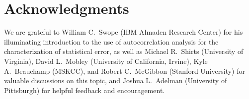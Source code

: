 \documentclass[aps,pre,twocolumn,nofootinbib,superscriptaddress,linenumbers,11point]{revtex4-1}
\begin{document}

\section*{Acknowledgments}

We are grateful to William C.~Swope (IBM Almaden Research Center) for his illuminating introduction to the use of autocorrelation analysis for the characterization of statistical error, as well as Michael R.~Shirts (University of Virginia), David L.~Mobley (University of California, Irvine), Kyle A.~Beauchamp (MSKCC), and Robert C.~McGibbon (Stanford University) for valuable discussions on this topic, and Joshua L.~Adelman (University of Pittsburgh) for helpful feedback and encouragement.


 

\end{document}
